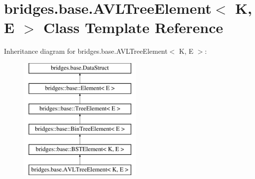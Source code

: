 \hypertarget{classbridges_1_1base_1_1_a_v_l_tree_element}{}\section{bridges.\+base.\+A\+V\+L\+Tree\+Element$<$ K, E $>$ Class Template Reference}
\label{classbridges_1_1base_1_1_a_v_l_tree_element}
Inheritance diagram for bridges.\+base.\+A\+V\+L\+Tree\+Element$<$ K, E $>$\+:\begin{figure}[H]
\begin{center}
\leavevmode
\includegraphics[height=6.000000cm]{classbridges_1_1base_1_1_a_v_l_tree_element}
\end{center}
\end{figure}
